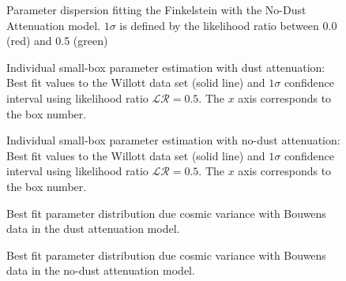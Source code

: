 \documentclass{emulateapj}
\begin{document}
\begin{figure}
\caption{Parameter dispersion fitting the Finkelstein with the No-Dust Attenuation model. 
$1\sigma$ is defined by the likelihood ratio between 0.0 (red) and 0.5 (green)}
\label{fig:OD4_MCMC_best_steps_wo}
\end{figure}


\begin{figure}
\caption{Individual small-box parameter estimation with dust attenuation: Best fit values 
to the Willott data set
(solid line) and $1\sigma$ confidence interval using likelihood ratio $\mathcal{LR}= 0.5$. 
The $x$ axis corresponds to the box number.}
\label{fig:OD1_individual_box_results_w}
\end{figure}


\begin{figure}
\caption{Individual small-box parameter estimation with no-dust attenuation: Best fit values 
to the Willott data set
(solid line) and $1\sigma$ confidence interval using likelihood ratio $\mathcal{LR}= 0.5$. 
The $x$ axis corresponds to the box number.}
\label{fig:OD1_individual_box_results_wo}
\end{figure}



\begin{figure}
\caption{Best fit parameter distribution due cosmic variance with Bouwens data in the dust
 attenuation model.}
\label{fig:OD2_CosmicVar1_w_dust}
\end{figure}

\begin{figure}
\caption{Best fit parameter distribution due cosmic variance with Bouwens data in the no-dust
 attenuation model.}
\label{fig:OD2_CosmicVar1_wo_dust}
\end{figure}
\end{document}
